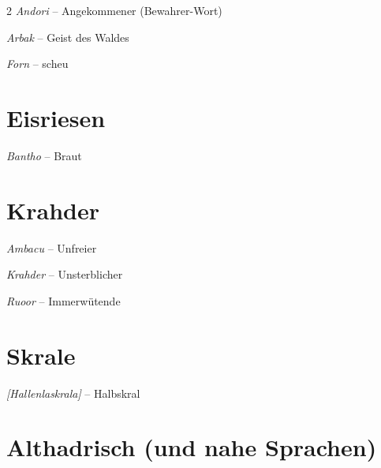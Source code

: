 \documentclass[10pt, a4paper, oneside]{book}
\newcommand{\fillbreak}{\vspace*{\fill}\columnbreak}
\begin{document}
\begin{multicols}{2}
\textit{Andori} – Angekommener
(Bewahrer-Wort)

\textit{Arbak} – Geist des Waldes

\textit{Forn} – scheu






\section{Eisriesen}

\textit{Bantho} – Braut






\section{Krahder}

\textit{Ambacu} – Unfreier

\textit{Krahder} – Unsterblicher

\textit{Ruoor} – Immerwütende










\section{Skrale}


\textit{[Hallenlaskrala]} – Halbskral




\fillbreak








\section{Althadrisch (und nahe Sprachen)}


\end{multicols}
\end{document}
